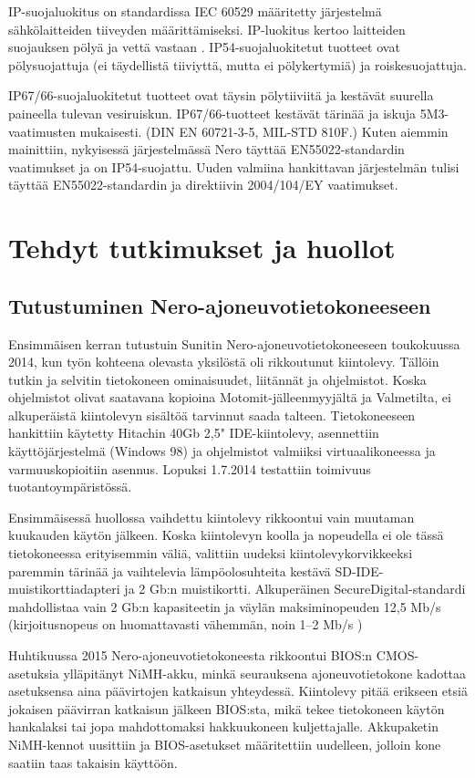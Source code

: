 IP-suojaluokitus on standardissa IEC 60529 määritetty järjestelmä sähkölaitteiden tiiveyden määrittämiseksi. IP-luokitus kertoo laitteiden suojauksen pölyä ja vettä vastaan \cite{IEC60529}. IP54-suojaluokitetut tuotteet ovat pölysuojattuja (ei täydellistä tiiviyttä, mutta ei pölykertymiä) ja roiskesuojattuja.

IP67/66-suojaluokitetut tuotteet ovat täysin pölytiiviitä ja kestävät suurella paineella tulevan vesiruiskun. IP67/66-tuotteet kestävät tärinää ja iskuja 5M3-vaatimusten mukaisesti. (DIN EN 60721-3-5, MIL-STD 810F.) Kuten aiemmin mainittiin, nykyisessä järjestelmässä Nero täyttää EN55022-standardin vaatimukset ja on IP54-suojattu. Uuden valmiina hankittavan järjestelmän tulisi täyttää EN55022-standardin ja direktiivin  2004/104/EY vaatimukset.

\newpage
\chapter{Tehdyt tutkimukset ja huollot}

\section{Tutustuminen Nero-ajoneuvotietokoneeseen}
Ensimmäisen kerran tutustuin Sunitin Nero-ajoneuvotietokoneeseen toukokuussa 2014, kun työn kohteena olevasta yksilöstä oli rikkoutunut kiintolevy. Tällöin tutkin ja selvitin tietokoneen ominaisuudet, liitännät ja ohjelmistot. Koska ohjelmistot olivat saatavana kopioina Motomit-jälleenmyyjältä ja Valmetilta, ei alkuperäistä kiintolevyn sisältöä tarvinnut saada talteen. Tietokoneeseen hankittiin käytetty Hitachin 40Gb 2,5" IDE-kiintolevy, asennettiin käyttöjärjestelmä (Windows 98) ja ohjelmistot valmiiksi virtuaalikoneessa ja varmuuskopioitiin asennus. Lopuksi 1.7.2014 testattiin toimivuus tuotantoympäristössä.

Ensimmäisessä huollossa vaihdettu kiintolevy rikkoontui vain muutaman kuukauden käytön jälkeen. Koska kiintolevyn koolla ja nopeudella ei ole tässä tietokoneessa erityisemmin väliä, valittiin uudeksi kiintolevykorvikkeeksi paremmin tärinää ja vaihtelevia lämpöolosuhteita kestävä SD-IDE-muistikorttiadapteri ja 2 Gb:n muistikortti. Alkuperäinen SecureDigital-standardi mahdollistaa vain 2 Gb:n kapasiteetin ja väylän maksiminopeuden 12,5 Mb/s (kirjoitusnopeus on huomattavasti vähemmän, noin 1--2 Mb/s ) \citep{sd:2gb}

Huhtikuussa 2015 Nero-ajoneuvotietokoneesta rikkoontui BIOS:n CMOS-asetuksia ylläpitänyt NiMH-akku, minkä seurauksena ajoneuvotietokone kadottaa asetuksensa aina päävirtojen katkaisun yhteydessä. Kiintolevy pitää erikseen etsiä jokaisen päävirran katkaisun jälkeen BIOS:sta, mikä tekee tietokoneen käytön hankalaksi tai jopa mahdottomaksi hakkuukoneen kuljettajalle. Akkupaketin NiMH-kennot uusittiin ja BIOS-asetukset määritettiin uudelleen, jolloin kone saatiin taas takaisin käyttöön.

